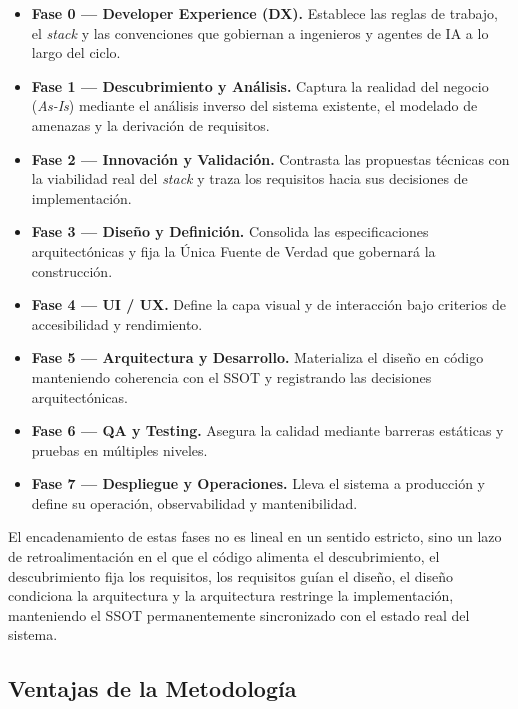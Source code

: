 \begin{itemize}[leftmargin=*, itemsep=2pt, topsep=2pt]
    \item \textbf{Fase 0 --- Developer Experience (DX).} Establece las reglas de
    trabajo, el \textit{stack} y las convenciones que gobiernan a ingenieros y
    agentes de IA a lo largo del ciclo.

    \item \textbf{Fase 1 --- Descubrimiento y Análisis.} Captura la realidad del
    negocio (\textit{As-Is}) mediante el análisis inverso del sistema existente,
    el modelado de amenazas y la derivación de requisitos.

    \item \textbf{Fase 2 --- Innovación y Validación.} Contrasta las propuestas
    técnicas con la viabilidad real del \textit{stack} y traza los requisitos hacia
    sus decisiones de implementación.

    \item \textbf{Fase 3 --- Diseño y Definición.} Consolida las especificaciones
    arquitectónicas y fija la Única Fuente de Verdad que gobernará la construcción.

    \item \textbf{Fase 4 --- UI / UX.} Define la capa visual y de interacción bajo
    criterios de accesibilidad y rendimiento.

    \item \textbf{Fase 5 --- Arquitectura y Desarrollo.} Materializa el diseño en
    código manteniendo coherencia con el SSOT y registrando las decisiones
    arquitectónicas.

    \item \textbf{Fase 6 --- QA y Testing.} Asegura la calidad mediante barreras
    estáticas y pruebas en múltiples niveles.

    \item \textbf{Fase 7 --- Despliegue y Operaciones.} Lleva el sistema a producción
    y define su operación, observabilidad y mantenibilidad.
\end{itemize}

El encadenamiento de estas fases no es lineal en un sentido estricto, sino un lazo
de retroalimentación en el que el código alimenta el descubrimiento, el
descubrimiento fija los requisitos, los requisitos guían el diseño, el diseño
condiciona la arquitectura y la arquitectura restringe la implementación,
manteniendo el SSOT permanentemente sincronizado con el estado real del sistema.

\subsection{Ventajas de la Metodología}
\label{subsec:dds_ventajas}

